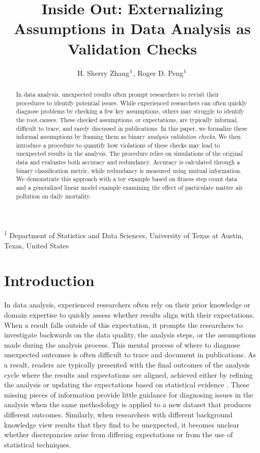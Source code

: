 \documentclass[
  12pt,
]{interact}
\title{Inside Out: Externalizing Assumptions in Data Analysis as
Validation Checks}
\author{H. Sherry Zhang$\textsuperscript{1}$, Roger D.
Peng$\textsuperscript{1}$}
\begin{document}
\captionsetup{labelsep=space}
\maketitle
\textsuperscript{1} Department of Statistics and Data
Sciences, University of Texas at Austin, Texas, United States
\begin{abstract}
In data analysis, unexpected results often prompt researchers to revisit
their procedures to identify potential issues. While experienced
researchers can often quickly diagnose problems by checking a few key
assumptions, others may struggle to identify the root causes. These
checked assumptions, or expectations, are typically informal, difficult
to trace, and rarely discussed in publications. In this paper, we
formalize these informal assumptions by framing them as binary
\emph{analysis validation checks}. We then introduce a procedure to
quantify how violations of these checks may lead to unexpected results
in the analysis. The procedure relies on simulations of the original
data and evaluates both accuracy and redundancy. Accuracy is calculated
through a binary classification metric, while redundancy is measured
using mutual information. We demonstrate this approach with a toy
example based on fitness step count data and a generalized linear model
example examining the effect of particulate matter air pollution on
daily mortality.
\end{abstract}


\section{Introduction}\label{introduction}

In data analysis, experienced researchers often rely on their prior
knowledge or domain expertise to quickly assess whether results align
with their expectations. When a result falls outside of this
expectation, it prompts the researchers to investigate backwards on the
data quality, the analysis steps, or the assumptions made during the
analysis process. This mental process of where to diagnose unexpected
outcomes is often difficult to trace and document in publications. As a
result, readers are typically presented with the final outcomes of the
analysis cycle where the results and expectations are aligned, achieved
either by refining the analysis or updating the expectations based on
statistical evidence \citep{grolemund_cognitive_2014}. These missing
pieces of information provide little guidance for diagnosing issues in
the analysis when the same methodology is applied to a new dataset that
produces different outcomes. Similarly, when researchers with different
background knowledge view results that they find to be unexpected, it
becomes unclear whether discrepancies arise from differing expectations
or from the use of statistical techniques.
\end{document}
